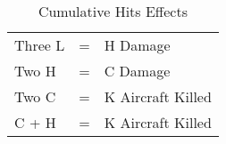 \begin{table}
\centering
\caption{Cumulative Hits Effects}
\medskip
\begin{tabular}{l@{ }c@{ }l}
\hline
Three L&=&H Damage\\
Two H&=&C Damage\\
Two C&=&K Aircraft Killed\\
C + H&=&K Aircraft Killed\\
\hline
\end{tabular}
\end{table}
